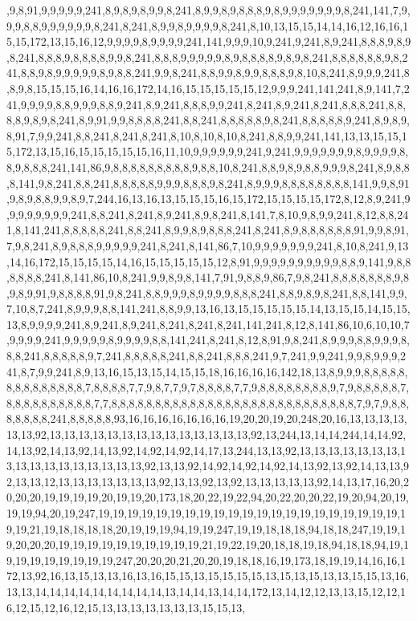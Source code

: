 ,9,8,91,9,9,9,9,9,241,8,9,8,9,8,9,9,8,241,8,9,9,8,9,8,8,8,9,8,9,9,9,9,9,9,9,8,241,141,7,9,9,9,8,8,9,9,9,9,9,9,8,241,8,241,8,9,9,8,9,9,9,9,8,241,8,10,13,15,15,14,14,16,12,16,16,15,15,172,13,15,16,12,9,9,9,9,8,9,9,9,9,241,141,9,9,9,10,9,241,9,241,8,9,241,8,8,8,9,8,9,8,241,8,8,8,9,8,8,8,8,9,9,8,241,8,8,8,9,9,9,9,9,8,9,8,8,8,8,9,8,9,8,241,8,8,8,8,8,8,9,8,241,8,8,9,8,9,9,9,9,9,8,9,8,8,241,9,9,8,241,8,8,9,9,8,9,9,8,8,8,9,8,10,8,241,8,9,9,9,241,8,8,9,8,15,15,15,16,14,16,16,172,14,16,15,15,15,15,15,12,9,9,9,241,141,241,8,9,141,7,241,9,9,9,9,8,8,9,9,9,8,8,9,241,8,9,241,8,8,8,9,9,241,8,241,8,9,241,8,241,8,8,8,241,8,8,8,8,9,8,9,8,241,8,9,91,9,9,8,8,8,8,241,8,8,241,8,8,8,8,8,9,8,241,8,8,8,8,8,9,241,8,9,8,9,8,91,7,9,9,241,8,8,241,8,241,8,241,8,10,8,10,8,10,8,241,8,8,9,9,241,141,13,13,15,15,15,172,13,15,16,15,15,15,15,15,16,11,10,9,9,9,9,9,9,241,9,241,9,9,9,9,9,9,9,8,9,9,9,9,8,8,9,8,8,8,241,141,86,9,8,8,8,8,8,8,8,8,8,9,8,8,10,8,241,8,8,9,8,9,8,8,9,9,9,8,241,8,9,8,8,8,141,9,8,241,8,8,241,8,8,8,8,8,9,9,9,8,8,8,9,8,241,8,9,9,9,8,8,8,8,8,8,8,8,141,9,9,8,91,9,8,9,8,8,9,9,8,9,7,244,16,13,16,13,15,15,15,16,15,172,15,15,15,15,172,8,12,8,9,241,9,9,9,9,9,9,9,9,241,8,8,241,8,241,8,9,241,8,9,8,241,8,141,7,8,10,9,8,9,9,241,8,12,8,8,241,8,141,241,8,8,8,8,8,241,8,8,241,8,9,9,8,9,8,8,8,241,8,241,8,9,8,8,8,8,8,8,91,9,9,8,91,7,9,8,241,8,9,8,8,8,9,9,9,9,9,241,8,241,8,141,86,7,10,9,9,9,9,9,9,9,241,8,10,8,241,9,13,14,16,172,15,15,15,15,14,16,15,15,15,15,15,12,8,91,9,9,9,9,9,9,9,9,9,9,8,8,9,141,9,8,8,8,8,8,8,241,8,141,86,10,8,241,9,9,8,9,8,141,7,91,9,8,8,9,86,7,9,8,241,8,8,8,8,8,8,8,9,8,9,8,9,91,9,8,8,8,8,91,9,8,241,8,8,9,9,9,8,9,9,9,9,8,8,8,241,8,8,9,8,9,8,241,8,8,141,9,9,7,10,8,7,241,8,9,9,9,8,8,141,241,8,8,9,9,13,16,13,15,15,15,15,15,14,13,15,15,14,15,15,13,8,9,9,9,9,241,8,9,241,8,9,241,8,241,8,241,8,241,141,241,8,12,8,141,86,10,6,10,10,7,9,9,9,9,241,9,9,9,9,9,8,9,9,9,9,8,8,141,241,8,241,8,12,8,91,9,8,241,8,9,9,9,8,8,9,9,9,8,8,8,241,8,8,8,8,8,9,7,241,8,8,8,8,8,241,8,8,241,8,8,8,241,9,7,241,9,9,241,9,9,8,9,9,9,241,8,7,9,9,241,8,9,13,16,15,13,15,14,15,15,18,16,16,16,16,142,18,13,8,9,9,9,8,8,8,8,8,8,8,8,8,8,8,8,8,8,7,8,8,8,8,7,7,9,8,7,7,9,7,8,8,8,8,7,7,9,8,8,8,8,8,8,8,8,9,7,9,8,8,8,8,8,7,8,8,8,8,8,8,8,8,8,8,7,7,8,8,8,8,8,8,8,8,8,8,8,8,8,8,8,8,8,8,8,8,8,8,8,8,8,8,8,8,7,9,7,9,8,8,8,8,8,8,8,241,8,8,8,8,8,93,16,16,16,16,16,16,16,19,20,20,19,20,248,20,16,13,13,13,13,13,13,92,13,13,13,13,13,13,13,13,13,13,13,13,13,13,92,13,244,13,14,14,244,14,14,92,14,13,92,14,13,92,14,13,92,14,92,14,92,14,17,13,244,13,13,92,13,13,13,13,13,13,13,13,13,13,13,13,13,13,13,13,13,92,13,13,92,14,92,14,92,14,92,14,13,92,13,92,14,13,13,92,13,13,12,13,13,13,13,13,13,13,92,13,13,92,13,92,13,13,13,13,13,92,14,13,17,16,20,20,20,20,19,19,19,19,20,19,19,20,173,18,20,22,19,22,94,20,22,20,20,22,19,20,94,20,19,19,19,94,20,19,247,19,19,19,19,19,19,19,19,19,19,19,19,19,19,19,19,19,19,19,19,19,19,19,21,19,18,18,18,18,20,19,19,19,94,19,19,247,19,19,18,18,18,94,18,18,247,19,19,19,20,20,20,19,19,19,19,19,19,19,19,19,19,21,19,22,19,20,18,18,19,18,94,18,18,94,19,19,19,19,19,19,19,19,19,247,20,20,20,21,20,20,19,18,18,16,19,173,18,19,19,14,16,16,172,13,92,16,13,15,13,13,16,13,16,15,15,13,15,15,15,15,13,15,13,15,13,13,15,15,13,16,13,13,14,14,14,14,14,14,14,14,14,13,14,14,13,14,14,172,13,14,12,12,13,13,15,12,12,16,12,15,12,16,12,15,13,13,13,13,13,13,13,15,15,13,
